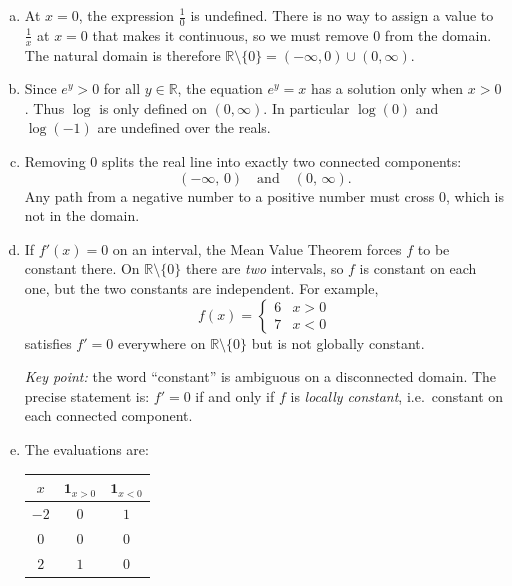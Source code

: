 \documentclass[12pt]{article}
\begin{document}
\begin{enumerate}[(a)]

    \item At $x = 0$, the expression $\frac{1}{0}$ is undefined. There is no way to assign a value to $\frac{1}{x}$ at $x = 0$ that makes it continuous, so we must remove $0$ from the domain. The natural domain is therefore $\mathbb{R} \setminus \{0\} = (-\infty, 0) \cup (0, \infty)$.

    \item Since $e^y > 0$ for all $y \in \mathbb{R}$, the equation $e^y = x$ has a solution only when $x > 0$. Thus $\log$ is only defined on $(0, \infty)$. In particular $\log(0)$ and $\log(-1)$ are undefined over the reals.

    \item Removing $0$ splits the real line into exactly two connected components:
    \[
        (-\infty,\, 0) \quad \text{and} \quad (0,\, \infty).
    \]
    Any path from a negative number to a positive number must cross $0$, which is not in the domain.

    \item If $f'(x) = 0$ on an interval, the Mean Value Theorem forces $f$ to be constant there. On $\mathbb{R} \setminus \{0\}$ there are \emph{two} intervals, so $f$ is constant on each one, but the two constants are independent. For example,
    \[
        f(x) = \begin{cases} 6 & x > 0 \\ 7 & x < 0 \end{cases}
    \]
    satisfies $f' = 0$ everywhere on $\mathbb{R} \setminus \{0\}$ but is not globally constant.

    \textit{Key point:} the word ``constant'' is ambiguous on a disconnected domain. The precise statement is: $f' = 0$ if and only if $f$ is \emph{locally constant}, i.e.\ constant on each connected component.

    \item The evaluations are:

    \medskip
    \begin{center}
    \begin{tabular}{c|cc}
        $x$ & $\mathbf{1}_{x>0}$ & $\mathbf{1}_{x<0}$ \\ \hline
        $-2$ & $0$ & $1$ \\
        $0$  & $0$ & $0$ \\
        $2$  & $1$ & $0$
    \end{tabular}
    \end{center}
    \medskip


\end{enumerate}
\end{document}
